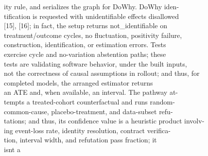 \documentclass[conference]{IEEEtran}
\begin{document}
ity rule, and serializes the graph for DoWhy. DoWhy iden-\\
tification is requested with unidentifiable effects disallowed\\
{[}15{]}, {[}16{]}; in fact, the setup returns not\_identifiable on\\
treatment/outcome cycles, no fluctuation, positivity failure,\\
construction, identification, or estimation errors. Tests\\
exercise cycle and no-variation abstention paths; these\\
tests are validating software behavior, under the built inputs,\\
not the correctness of causal assumptions in rollout; and thus, for\\
completed models, the arranged estimator returns\\
an ATE and, when available, an interval. The pathway at-\\
tempts a treated-cohort counterfactual and runs random-\\
common-cause, placebo-treatment, and data-subset refu-\\
tations; and thus, its confidence value is a heuristic product involv-\\
ing event-loss rate, identity resolution, contract verifica-\\
tion, interval width, and refutation pass fraction; it\\
isn\textquotesingle t a\\
\end{document}
